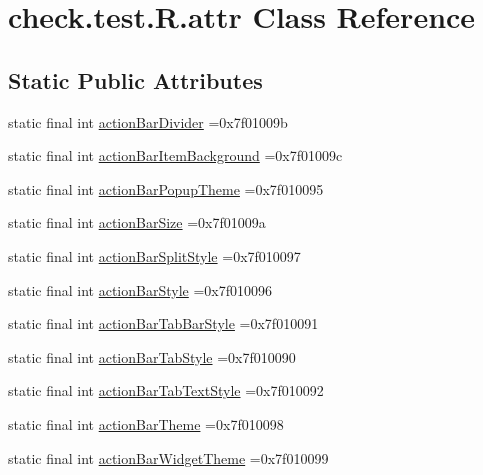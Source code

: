 \hypertarget{classcheck_1_1test_1_1_r_1_1attr}{}\section{check.\+test.\+R.\+attr Class Reference}
\label{classcheck_1_1test_1_1_r_1_1attr}
\subsection*{Static Public Attributes}
\begin{DoxyCompactItemize}
\item 
static final int \hyperlink{classcheck_1_1test_1_1_r_1_1attr_a231d531e25674903c0fc051027b53e1f}{action\+Bar\+Divider} =0x7f01009b
\item 
static final int \hyperlink{classcheck_1_1test_1_1_r_1_1attr_a11f2699ca7c3187bf87d25f5d33e1237}{action\+Bar\+Item\+Background} =0x7f01009c
\item 
static final int \hyperlink{classcheck_1_1test_1_1_r_1_1attr_a4ab4b2cb9a1376a8d56e464bd8eb74a2}{action\+Bar\+Popup\+Theme} =0x7f010095
\item 
static final int \hyperlink{classcheck_1_1test_1_1_r_1_1attr_a402641d680366de8aaf8c4fb48bda10f}{action\+Bar\+Size} =0x7f01009a
\item 
static final int \hyperlink{classcheck_1_1test_1_1_r_1_1attr_a6557ab4a25c517d04661c987b9ddd3ef}{action\+Bar\+Split\+Style} =0x7f010097
\item 
static final int \hyperlink{classcheck_1_1test_1_1_r_1_1attr_a10ba248fd78f9255e076be391a8965c7}{action\+Bar\+Style} =0x7f010096
\item 
static final int \hyperlink{classcheck_1_1test_1_1_r_1_1attr_a87898eccbaa7fa385bf19395d0a5b922}{action\+Bar\+Tab\+Bar\+Style} =0x7f010091
\item 
static final int \hyperlink{classcheck_1_1test_1_1_r_1_1attr_af4b84f04cbf930199baf459bd577b438}{action\+Bar\+Tab\+Style} =0x7f010090
\item 
static final int \hyperlink{classcheck_1_1test_1_1_r_1_1attr_aff28ad7140f8babb08a120b09cb32cc9}{action\+Bar\+Tab\+Text\+Style} =0x7f010092
\item 
static final int \hyperlink{classcheck_1_1test_1_1_r_1_1attr_ae4102aa166097ebb0e9d11c82b2ad401}{action\+Bar\+Theme} =0x7f010098
\item 
static final int \hyperlink{classcheck_1_1test_1_1_r_1_1attr_abfe49028f89a795ded936ee9dc2a850b}{action\+Bar\+Widget\+Theme} =0x7f010099

\end{DoxyCompactItemize}
